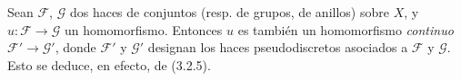 \begin{env}[3.8.2]
\label{0.3.8.2-fr}
Sean $\mathcal{F}$, $\mathcal{G}$ dos haces de conjuntos (resp. de grupos,
de anillos) sobre $X$, y $u:\mathcal{F}\to\mathcal{G}$ un homomorfismo.
Entonces $u$ es también un homomorfismo \emph{continuo}
$\mathcal{F}'\to\mathcal{G}'$, donde $\mathcal{F}'$ y $\mathcal{G}'$ designan
los haces pseudodiscretos asociados a $\mathcal{F}$ y $\mathcal{G}$.
Esto se deduce, en efecto, de (3.2.5).
\end{env}
